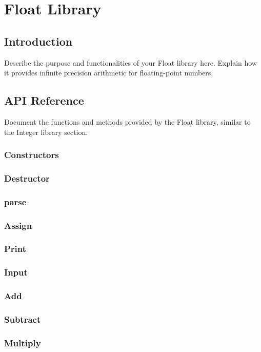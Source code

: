 
\section{Float Library}

\subsection{Introduction}

Describe the purpose and functionalities of your Float library here. Explain how it provides infinite precision arithmetic for floating-point numbers. 

\subsection{API Reference}

Document the functions and methods provided by the Float library, similar to the Integer library section.
\subsubsection{Constructors}
\subsubsection{Destructor}
\subsubsection{parse}
\subsubsection{Assign}
\subsubsection{Print}
\subsubsection{Input}
\subsubsection{Add}
\subsubsection{Subtract}
\subsubsection{Multiply}
